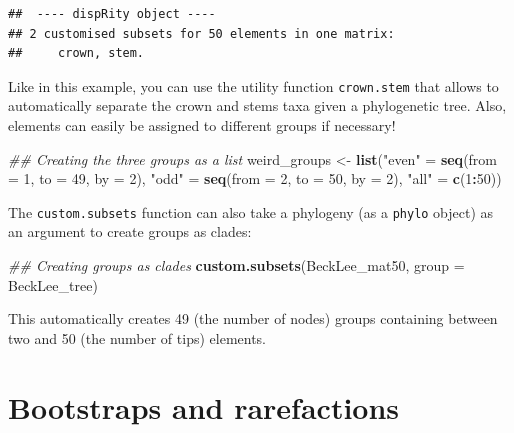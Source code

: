 \documentclass[]{book}
\newenvironment{Shaded}{\begin{snugshade}}{\end{snugshade}}
\newcommand{\CommentTok}[1]{\textcolor[rgb]{0.56,0.35,0.01}{\textit{#1}}}
\newcommand{\DataTypeTok}[1]{\textcolor[rgb]{0.13,0.29,0.53}{#1}}
\newcommand{\DecValTok}[1]{\textcolor[rgb]{0.00,0.00,0.81}{#1}}
\newcommand{\KeywordTok}[1]{\textcolor[rgb]{0.13,0.29,0.53}{\textbf{#1}}}
\newcommand{\NormalTok}[1]{#1}
\newcommand{\OperatorTok}[1]{\textcolor[rgb]{0.81,0.36,0.00}{\textbf{#1}}}
\newcommand{\StringTok}[1]{\textcolor[rgb]{0.31,0.60,0.02}{#1}}
\begin{document}
\begin{verbatim}
##  ---- dispRity object ---- 
## 2 customised subsets for 50 elements in one matrix:
##     crown, stem.
\end{verbatim}

Like in this example, you can use the utility function \texttt{crown.stem} that allows to automatically separate the crown and stems taxa given a phylogenetic tree.
Also, elements can easily be assigned to different groups if necessary!

\begin{Shaded}
\begin{Highlighting}[]
\CommentTok{## Creating the three groups as a list}
\NormalTok{weird_groups <-}\StringTok{ }\KeywordTok{list}\NormalTok{(}\StringTok{"even"}\NormalTok{ =}\StringTok{ }\KeywordTok{seq}\NormalTok{(}\DataTypeTok{from =} \DecValTok{1}\NormalTok{, }\DataTypeTok{to =} \DecValTok{49}\NormalTok{, }\DataTypeTok{by =} \DecValTok{2}\NormalTok{),}
                      \StringTok{"odd"}\NormalTok{ =}\StringTok{ }\KeywordTok{seq}\NormalTok{(}\DataTypeTok{from =} \DecValTok{2}\NormalTok{, }\DataTypeTok{to =} \DecValTok{50}\NormalTok{, }\DataTypeTok{by =} \DecValTok{2}\NormalTok{),}
                      \StringTok{"all"}\NormalTok{ =}\StringTok{ }\KeywordTok{c}\NormalTok{(}\DecValTok{1}\OperatorTok{:}\DecValTok{50}\NormalTok{))}
\end{Highlighting}
\end{Shaded}

The \texttt{custom.subsets} function can also take a phylogeny (as a \texttt{phylo} object) as an argument to create groups as clades:

\begin{Shaded}
\begin{Highlighting}[]
\CommentTok{## Creating groups as clades}
\KeywordTok{custom.subsets}\NormalTok{(BeckLee_mat50, }\DataTypeTok{group =}\NormalTok{ BeckLee_tree)}
\end{Highlighting}
\end{Shaded}

This automatically creates 49 (the number of nodes) groups containing between two and 50 (the number of tips) elements.

\hypertarget{bootstraps-and-rarefactions}{%
\section{Bootstraps and rarefactions}\label{bootstraps-and-rarefactions}}
\end{document}
